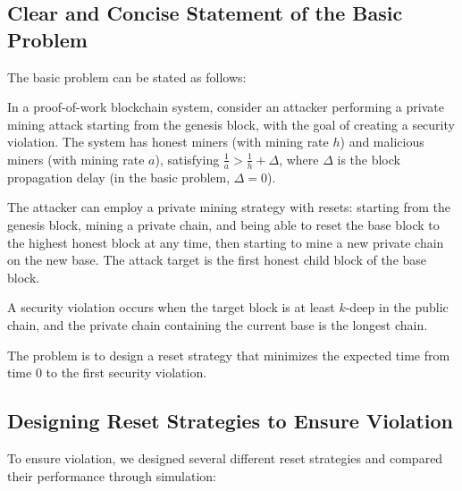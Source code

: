 \documentclass[12pt,a4paper]{article}
\begin{document}
\subsection{Clear and Concise Statement of the Basic Problem}

The basic problem can be stated as follows:

In a proof-of-work blockchain system, consider an attacker performing a private mining attack starting from the genesis block, with the goal of creating a security violation. The system has honest miners (with mining rate $h$) and malicious miners (with mining rate $a$), satisfying $\frac{1}{a} > \frac{1}{h} + \Delta$, where $\Delta$ is the block propagation delay (in the basic problem, $\Delta = 0$).

The attacker can employ a private mining strategy with resets: starting from the genesis block, mining a private chain, and being able to reset the base block to the highest honest block at any time, then starting to mine a new private chain on the new base. The attack target is the first honest child block of the base block.

A security violation occurs when the target block is at least $k$-deep in the public chain, and the private chain containing the current base is the longest chain.

The problem is to design a reset strategy that minimizes the expected time from time 0 to the first security violation.

\subsection{Designing Reset Strategies to Ensure Violation}

To ensure violation, we designed several different reset strategies and compared their performance through simulation:
\end{document}
